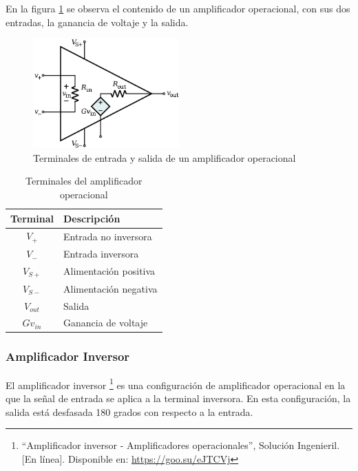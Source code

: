             En la figura \ref{fig:Amplificador_Operacional} se observa el contenido de un amplificador operacional, con sus dos entradas, la ganancia de voltaje y la salida.

            \begin{figure}[H]
                \centering
                \includegraphics[width=0.5\textwidth]{img/Marco/Amplificador_Operacional.png}
                \caption[Terminales de entrada y salida de un amplificador operacional]{Terminales de entrada y salida de un amplificador operacional\footnotemark}
                \label{fig:Amplificador_Operacional}
            \end{figure}

            \begin{table}[H]
                \centering
                \begin{tabular}{ c | l }
                    Terminal & Descripción \\ \hline
                    $V_+$ & Entrada no inversora \\
                    $V_-$ & Entrada inversora \\
                    $V_{S+}$ & Alimentación positiva \\
                    $V_{S-}$ & Alimentación negativa \\
                    $V_{out}$ & Salida \\
                    $Gv_{in}$ & Ganancia de voltaje \\
                \end{tabular}
                \caption{Terminales del amplificador operacional}
                \label{tab:terminales_amplificador}
            \end{table}

        \subsubsection{Amplificador Inversor}
            El amplificador inversor \footnote{``Amplificador inversor - Amplificadores operacionales'', Solución Ingenieril. [En línea]. Disponible en: \url{https://goo.su/eJTCVj}} es una configuración de amplificador operacional en la que la señal de entrada se aplica a la terminal inversora. En esta configuración, la salida está desfasada 180 grados con respecto a la entrada.

